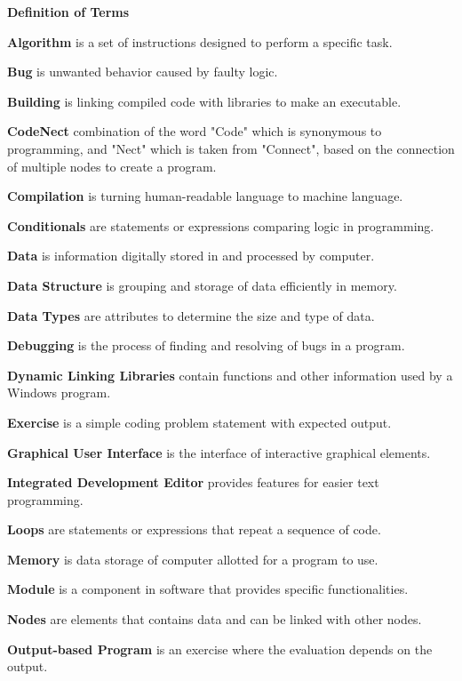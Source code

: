 \flushleft
\textbf{Definition of Terms}\\
\justifying

\parx
\textbf{Algorithm} is a set of instructions designed to perform a specific task.

\parx
\textbf{Bug} is unwanted behavior caused by faulty logic.

\parx
\textbf{Building} is linking compiled code with libraries to make an executable.

\parx
\textbf{CodeNect} combination of the word "Code" which is synonymous to
programming, and "Nect" which is taken from "Connect", based on the connection
of multiple nodes to create a program.

\parx
\textbf{Compilation} is turning human-readable language to machine language.

\parx
\textbf{Conditionals} are statements or expressions comparing logic in programming.

\parx
\textbf{Data} is information digitally stored in and processed by computer.

\parx
\textbf{Data Structure} is grouping and storage of data efficiently in memory.

\parx
\textbf{Data Types} are attributes to determine the size and type of data.

\parx
\textbf{Debugging} is the process of finding and resolving of bugs in a program.

\parx
\textbf{Dynamic Linking Libraries} contain functions and other information used
by a Windows program.

\parx
\textbf{Exercise} is a simple coding problem statement with expected output.

\parx
\textbf{Graphical User Interface} is the interface of interactive graphical elements.

\parx
\textbf{Integrated Development Editor} provides features for easier text programming.

\parx
\textbf{Loops} are statements or expressions that repeat a sequence of code.

\parx
\textbf{Memory} is data storage of computer allotted for a program to use.

\parx
\textbf{Module} is a component in software that provides specific functionalities.

\parx
\textbf{Nodes} are elements that contains data and can be linked with other nodes.

\parx
\textbf{Output-based Program} is an exercise where the evaluation depends on the output.


